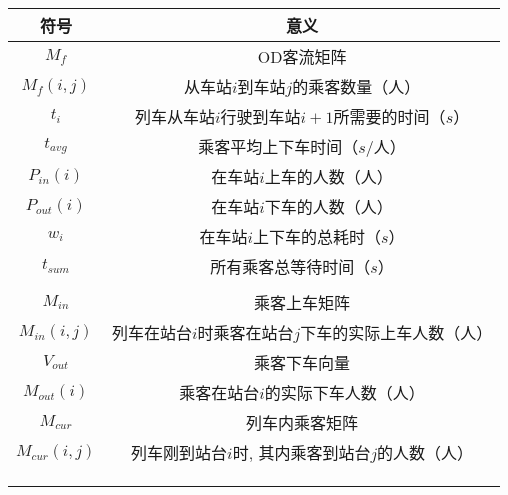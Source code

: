 \begin{table}[h]
    \centering
    \begin{tabular}{@{}cc@{}}
    \toprule
    符号         & 意义                              \\ \midrule
    $M_f$       & OD客流矩阵                          \\
    $M_f(i,j)$  & 从车站$i$到车站$j$的乘客数量（人）            \\
    $t_i$       & 列车从车站$i$行驶到车站$i+1$所需要的时间（$s$） \\
    $t_{avg}$   & 乘客平均上下车时间（$s$/人）                  \\
    $P_{in}(i)$         &  在车站$i$上车的人数（人）    \\
    $P_{out}(i)$        & 在车站$i$下车的人数（人）   \\
    $w_i$       & 在车站$i$上下车的总耗时（$s$） \\
    $t_{sum}$   & 所有乘客总等待时间（$s$）     \\
                &                                 \\
    $M_{in}$    & 乘客上车矩阵           \\
    $M_{in}(i,j)$    & 列车在站台$i$时乘客在站台$j$下车的实际上车人数（人）     \\
    $V_{out}$    & 乘客下车向量           \\
    $M_{out}(i)$    & 乘客在站台$i$的实际下车人数（人）     \\
    $M_{cur}$    & 列车内乘客矩阵           \\
    $M_{cur}(i,j)$    & 列车刚到站台$i$时, 其内乘客到站台$j$的人数（人）     \\
                &                                 \\
                &                                 \\
                &                                 \\ \bottomrule
    \end{tabular}
\end{table}
